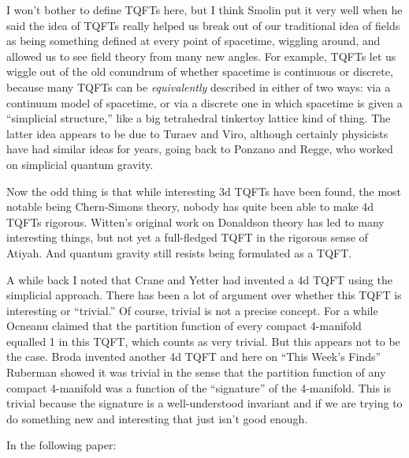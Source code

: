 \documentclass{article}
\def\tightlist{}
\renewcommand{\texttt}[1]{%
  \begingroup
  \ttfamily
  \begingroup\lccode`~=`/\lowercase{\endgroup\def~}{/\discretionary{}{}{}}%
  \begingroup\lccode`~=`[\lowercase{\endgroup\def~}{[\discretionary{}{}{}}%
  \begingroup\lccode`~=`.\lowercase{\endgroup\def~}{.\discretionary{}{}{}}%
  \catcode`/=\active\catcode`[=\active\catcode`.=\active
  \scantokens{#1\noexpand}%
  \endgroup
}
\begin{document}
I won't bother to define TQFTs here, but I think Smolin put it very well
when he said the idea of TQFTs really helped us break out of our
traditional idea of fields as being something defined at every point of
spacetime, wiggling around, and allowed us to see field theory from many
new angles. For example, TQFTs let us wiggle out of the old conundrum of
whether spacetime is continuous or discrete, because many TQFTs can be
\emph{equivalently} described in either of two ways: via a continuum
model of spacetime, or via a discrete one in which spacetime is given a
``simplicial structure,'' like a big tetrahedral tinkertoy lattice kind
of thing. The latter idea appears to be due to Turaev and Viro, although
certainly physicists have had similar ideas for years, going back to
Ponzano and Regge, who worked on simplicial quantum gravity.

Now the odd thing is that while interesting 3d TQFTs have been found,
the most notable being Chern-Simons theory, nobody has quite been able
to make 4d TQFTs rigorous. Witten's original work on Donaldson theory
has led to many interesting things, but not yet a full-fledged TQFT in
the rigorous sense of Atiyah. And quantum gravity still resists being
formulated as a TQFT.

A while back I noted that Crane and Yetter had invented a 4d TQFT using
the simplicial approach. There has been a lot of argument over whether
this TQFT is interesting or ``trivial.'' Of course, trivial is not a
precise concept. For a while Ocneanu claimed that the partition function
of every compact 4-manifold equalled 1 in this TQFT, which counts as
very trivial. But this appears not to be the case. Broda invented
another 4d TQFT and here on ``This Week's Finds'' Ruberman showed it was
trivial in the sense that the partition function of any compact
4-manifold was a function of the ``signature'' of the 4-manifold. This
is trivial because the signature is a well-understood invariant and if
we are trying to do something new and interesting that just isn't good
enough.

In the following paper:

\end{document}
